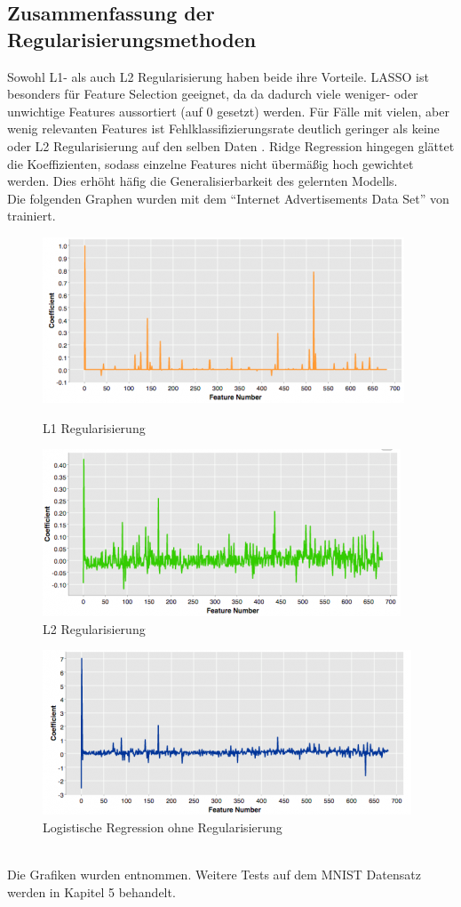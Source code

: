 \subsection{Zusammenfassung der Regularisierungsmethoden}
Sowohl L1- als auch L2 Regularisierung haben beide ihre Vorteile. LASSO ist besonders für Feature Selection geeignet, da da dadurch viele weniger- oder unwichtige Features aussortiert (auf 0 gesetzt) werden. Für Fälle mit vielen, aber wenig relevanten Features ist Fehlklassifizierungsrate deutlich geringer als keine oder L2 Regularisierung auf den selben Daten \cite{NG}. Ridge Regression hingegen glättet die Koeffizienten, sodass einzelne Features nicht übermäßig hoch gewichtet werden. Dies erhöht häfig die Generalisierbarkeit des gelernten Modells.\\
Die folgenden Graphen wurden mit dem "`Internet Advertisements Data Set"' von \cite{DUA2019} trainiert.\\
\begin{figure}[ht]
\centering
	\begin{minipage}[b]{.4\linewidth}
  		\includegraphics[scale=0.8]{bilder/laplace}
  		\caption{L1 Regularisierung}
  	\end{minipage}
  	\hspace{.1\linewidth}%
  	\begin{minipage}[b]{.4\linewidth}
  		\includegraphics[scale=0.8]{bilder/gauss}
		\caption{L2 Regularisierung}
	\end{minipage}
\end{figure}
\begin{figure}[ht]
\centering
\includegraphics[scale=.8]{bilder/no_reg}
\caption{Logistische Regression ohne Regularisierung}
\end{figure}\\
Die Grafiken wurden \cite{L12} entnommen.
Weitere Tests auf dem MNIST Datensatz \cite{MNIST} werden in Kapitel 5 behandelt.

